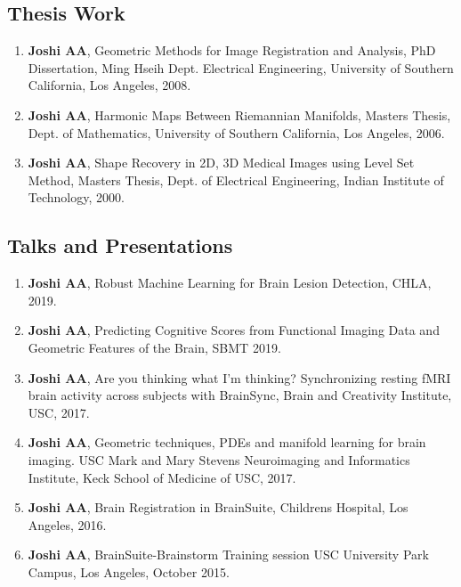 \documentclass[overlapped,line,letterpaper]{res}
\begin{document}
\begin{resume}
\subsection{Thesis Work}
\begin{enumerate}
    \item \textbf{Joshi AA}, Geometric Methods for Image Registration and Analysis, PhD Dissertation, Ming Hseih Dept. Electrical Engineering, University of Southern California, Los Angeles, 2008.

    \item \textbf{Joshi AA}, Harmonic Maps Between Riemannian Manifolds, Masters Thesis, Dept. of Mathematics, University of Southern California, Los Angeles, 2006.

    \item \textbf{Joshi AA}, Shape Recovery in 2D, 3D Medical Images using Level Set Method, Masters Thesis, Dept. of Electrical Engineering, Indian Institute of Technology, 2000.

\end{enumerate}

\subsection{Talks and Presentations}
\begin{enumerate}

    \item \textbf{Joshi AA}, Robust Machine Learning for Brain Lesion Detection, CHLA, 2019. 

    \item \textbf{Joshi AA}, Predicting Cognitive Scores from Functional Imaging Data and Geometric Features of the Brain, SBMT 2019.

    \item \textbf{Joshi AA}, Are you thinking what I'm thinking? Synchronizing resting fMRI brain activity across subjects with BrainSync, Brain and Creativity Institute, USC, 2017.

    \item \textbf{Joshi AA}, Geometric techniques, PDEs and manifold learning for brain imaging. USC Mark and Mary Stevens
Neuroimaging and Informatics Institute, Keck School of Medicine of USC, 2017.

    \item \textbf{Joshi AA}, Brain Registration in BrainSuite, Childrens Hospital, Los Angeles, 2016.

    \item \textbf{Joshi AA}, BrainSuite-Brainstorm Training session USC University Park Campus, Los Angeles, October 2015.


\end{enumerate}
\end{resume}
\end{document}
